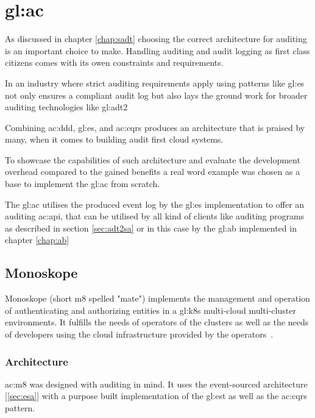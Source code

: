 %
\chapter{\gls{gl:ac}}\label{chap:ac}

As discussed in chapter \ref{chap:sadt} choosing the correct architecture for auditing is an important choice to make. Handling auditing and audit logging as first class citizens comes with its owen constraints and requirements.

In an industry where strict auditing requirements apply using patterns like \gls{gl:es} not only ensures a compliant audit log but also lays the ground work for broader auditing technologies like \gls{gl:adt2}

Combining \gls{ac:ddd}, \gls{gl:es}, and \gls{ac:cqrs} produces an architecture that is praised by many, when it comes to building audit first cloud systems.

To showcase the capabilities of such architecture and evaluate the development overhead compared to the gained benefits a real word example was chosen as a base to implement the \gls{gl:ac} from scratch.

The \gls{gl:ac} utilises the produced event log by the \gls{gl:es} implementation to offer an auditing \gls{ac:api}, that can be utilised by all kind of clients like auditing programs as described in section \ref{sec:adt2sa} or in this case by the \gls{gl:ab} implemented in chapter \ref{chap:ab}

\pagebreak

\section{Monoskope}\label{sec:m8}

Monoskope (short m8 spelled "mate") implements the management and operation of authenticating and authorizing entities in a \gls{gl:k8s} multi-cloud multi-cluster environments. It fulfills the needs of operators of the clusters as well as the needs of developers using the cloud infrastructure provided by the operators~\citep{monoskope}.

\subsection{Architecture}

\Gls{ac:m8} was designed with auditing in mind. It uses the event-sourced architecture [\ref{sec:esa}] with a purpose built implementation of the \gls{gl:est} as well as the \gls{ac:cqrs} pattern.

